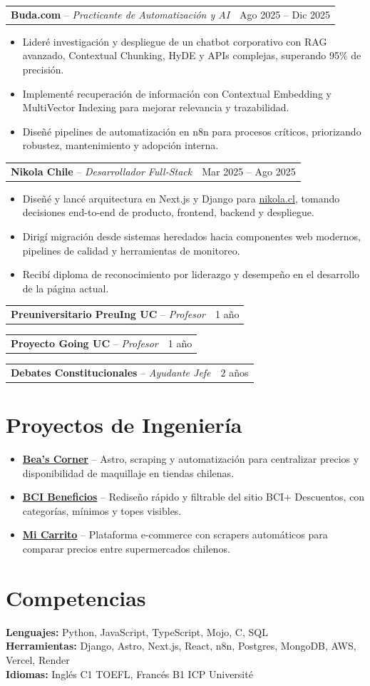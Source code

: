 \documentclass[10pt,letterpaper]{article}
\makeatletter
\newcommand{\entry}[4]{%
  \begin{tabularx}{\linewidth}{@{}Xr@{}}
    \textbf{#1} -- \textit{#2} & {\color{textgray}#3} \\
  \end{tabularx}
  #4
}
\makeatother
\begin{document}
\entry{Buda.com}{Practicante de Automatización y AI}{Ago 2025 -- Dic 2025}{
\begin{itemize}
  \item Lideré investigación y despliegue de un chatbot corporativo con RAG avanzado, Contextual Chunking, HyDE y APIs complejas, superando 95\% de precisión.
  \item Implementé recuperación de información con Contextual Embedding y MultiVector Indexing para mejorar relevancia y trazabilidad.
  \item Diseñé pipelines de automatización en n8n para procesos críticos, priorizando robustez, mantenimiento y adopción interna.
\end{itemize}}

\entry{Nikola Chile}{Desarrollador Full-Stack}{Mar 2025 -- Ago 2025}{
\begin{itemize}
  \item Diseñé y lancé arquitectura en Next.js y Django para \href{https://www.nikola.cl}{nikola.cl}, tomando decisiones end-to-end de producto, frontend, backend y despliegue.
  \item Dirigí migración desde sistemas heredados hacia componentes web modernos, pipelines de calidad y herramientas de monitoreo.
  \item Recibí diploma de reconocimiento por liderazgo y desempeño en el desarrollo de la página actual.
\end{itemize}}

\entry{Preuniversitario PreuIng UC}{Profesor}{1 año}{}
\entry{Proyecto Going UC}{Profesor}{1 año}{}
\entry{Debates Constitucionales}{Ayudante Jefe}{2 años}{}

\section{Proyectos de Ingeniería}
\begin{itemize}
  \item \textbf{\href{https://beascorner.onrender.com/}{Bea's Corner}} -- Astro, scraping y automatización para centralizar precios y disponibilidad de maquillaje en tiendas chilenas.
  \item \textbf{\href{https://bcibeneficios.onrender.com/}{BCI Beneficios}} -- Rediseño rápido y filtrable del sitio BCI+ Descuentos, con categorías, mínimos y topes visibles.
  \item \textbf{\href{https://micarritochile.vercel.app/}{Mi Carrito}} -- Plataforma e-commerce con scrapers automáticos para comparar precios entre supermercados chilenos.
\end{itemize}

\section{Competencias}
\textbf{Lenguajes:} Python, JavaScript, TypeScript, Mojo, C, SQL \\
\textbf{Herramientas:} Django, Astro, Next.js, React, n8n, Postgres, MongoDB, AWS, Vercel, Render \\
\textbf{Idiomas:} Inglés C1 TOEFL, Francés B1 ICP Université
\end{document}
